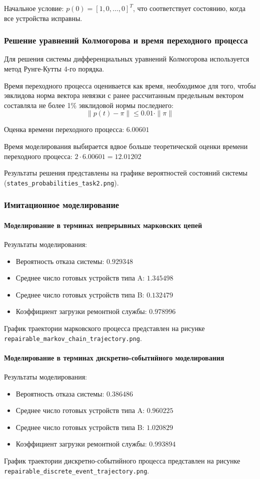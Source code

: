 Начальное условие: $p(0) = [1, 0, \ldots, 0]^T$, что соответствует состоянию, когда все устройства исправны.

\subsubsection{Решение уравнений Колмогорова и время переходного процесса}

Для решения системы дифференциальных уравнений Колмогорова используется метод Рунге-Кутты 4-го порядка.

Время переходного процесса оценивается как время, необходимое для того, чтобы эвклидова норма вектора невязки с ранее рассчитанным предельным вектором составляла не более 1\% эвклидовой нормы последнего:
\begin{equation}
\|p(t) - \pi\| \leq 0.01 \cdot \|\pi\|
\end{equation}

Оценка времени переходного процесса: $6.00601$

Время моделирования выбирается вдвое больше теоретической оценки времени переходного процесса: $2 \cdot 6.00601 = 12.01202$

Результаты решения представлены на графике вероятностей состояний системы (\texttt{states\_probabilities\_task2.png}).

\subsubsection{Имитационное моделирование}

\paragraph{Моделирование в терминах непрерывных марковских цепей}
Результаты моделирования:
\begin{itemize}
    \item Вероятность отказа системы: $0.929348$
    \item Среднее число готовых устройств типа A: $1.345498$
    \item Среднее число готовых устройств типа B: $0.132479$
    \item Коэффициент загрузки ремонтной службы: $0.978996$
\end{itemize}

График траектории марковского процесса представлен на рисунке \texttt{repairable\_markov\_chain\_trajectory.png}.

\paragraph{Моделирование в терминах дискретно-событийного моделирования}
Результаты моделирования:
\begin{itemize}
    \item Вероятность отказа системы: $0.386486$
    \item Среднее число готовых устройств типа A: $0.960225$
    \item Среднее число готовых устройств типа B: $1.020829$
    \item Коэффициент загрузки ремонтной службы: $0.993894$
\end{itemize}

График траектории дискретно-событийного процесса представлен на рисунке \texttt{repairable\_discrete\_event\_trajectory.png}.

\newpage

